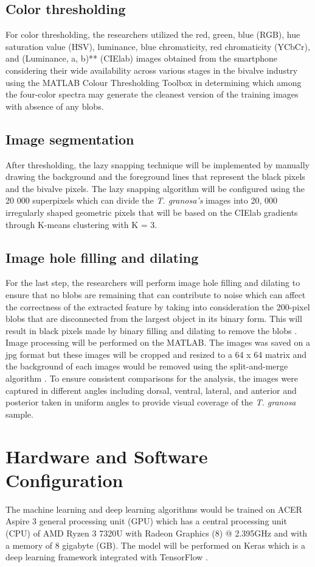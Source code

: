 \subsection{Color thresholding}
For color thresholding, the researchers utilized the red, green, blue (RGB), hue saturation value (HSV), luminance, blue chromaticity, red chromaticity (YCbCr), and (Luminance, a, b)** (CIElab) images obtained from the smartphone considering their wide availability across various stages in the bivalve industry using the MATLAB Colour Thresholding Toolbox in determining which among the four-color spectra may generate the cleanest version of the training images with absence of any blobs. 

\subsection{Image segmentation}
After thresholding, the lazy snapping technique will be implemented by manually drawing the background and the foreground lines that represent the black pixels and the bivalve pixels. The lazy snapping algorithm will be configured using the 20 000 superpixels which can divide the \textit{T. granosa’s} images into 20, 000 irregularly shaped geometric pixels that will be based on the CIElab gradients through K-means clustering with K = 3.

\subsection{Image hole filling and dilating}
For the last step, the researchers will perform image hole filling and dilating to ensure that no blobs are remaining that can contribute to noise which can affect the correctness of the extracted feature by taking into consideration the 200-pixel blobs that are disconnected from the largest object in its binary form. This will result in black pixels made by binary filling and dilating to remove the blobs \cite{concepcion2023}.
Image processing will be performed on the MATLAB. The images was saved on a jpg format but these images will be cropped and resized to a 64 x 64 matrix and the background of each images would be removed using the split-and-merge algorithm \cite{cui2020}. 
To ensure consistent comparisons for the analysis, the images were captured in different angles including dorsal, ventral, lateral, and anterior and posterior taken in uniform angles to provide visual coverage of the \textit{T. granosa} sample. 

\section{Hardware and Software Configuration}
The machine learning and deep learning algorithms would be trained on ACER Aspire 3 general processing unit (GPU) which has a central processing unit (CPU) of  AMD Ryzen 3 7320U with Radeon Graphics (8) @ 2.395GHz and with a memory of 8 gigabyte (GB). The model will be performed on Keras which is a deep learning framework integrated with TensorFlow \cite{cui2020}.

